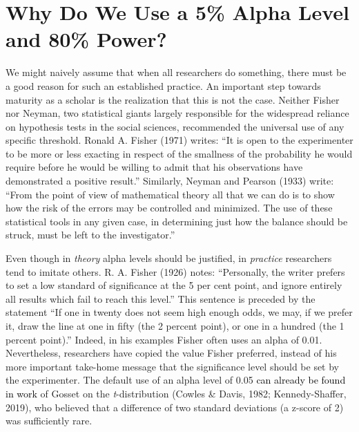 \documentclass[
  english,
  ,man, a4paper,floatsintext]{apa6}
\begin{document}
\hypertarget{why-do-we-use-a-5-alpha-level-and-80-power}{%
\section{Why Do We Use a 5\% Alpha Level and 80\% Power?}\label{why-do-we-use-a-5-alpha-level-and-80-power}}

We might naively assume that when all researchers do something, there must be a good reason for such an established practice. An important step towards maturity as a scholar is the realization that this is not the case. Neither Fisher nor Neyman, two statistical giants largely responsible for the widespread reliance on hypothesis tests in the social sciences, recommended the universal use of any specific threshold. Ronald A. Fisher (1971) writes: ``It is open to the experimenter to be more or less exacting in respect of the smallness of the probability he would require before he would be willing to admit that his observations have demonstrated a positive result.'' Similarly, Neyman and Pearson (1933) write: ``From the point of view of mathematical theory all that we can do is to show how the risk of the errors may be controlled and minimized. The use of these statistical tools in any given case, in determining just how the balance should be struck, must be left to the investigator.''

Even though in \emph{theory} alpha levels should be justified, in \emph{practice} researchers tend to imitate others. R. A. Fisher (1926) notes: ``Personally, the writer prefers to set a low standard of significance at the 5 per cent point, and ignore entirely all results which fail to reach this level.'' This sentence is preceded by the statement ``If one in twenty does not seem high enough odds, we may, if we prefer it, draw the line at one in fifty (the 2 percent point), or one in a hundred (the 1 percent point).'' Indeed, in his examples Fisher often uses an alpha of 0.01. Nevertheless, researchers have copied the value Fisher preferred, instead of his more important take-home message that the significance level should be set by the experimenter. The default use of an alpha level of 0.05 \textcolor{black}{can already be found in work} of Gosset on the \emph{t}-distribution (Cowles \& Davis, 1982; Kennedy-Shaffer, 2019), who believed that a difference of two standard deviations (a z-score of 2) was sufficiently rare.
\end{document}
